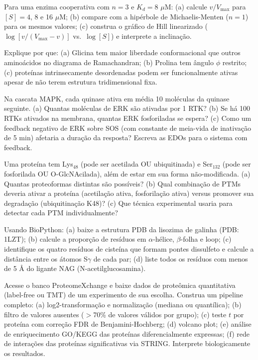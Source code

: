 \begin{exercicio}[Hill]
Para uma enzima cooperativa com $n = 3$ e $K_d = 8$ $\mu$M: (a) calcule $v/V_{\max}$
para $[S] = 4$, 8 e 16 $\mu$M; (b) compare com a hipérbole de Michaelis-Menten
($n = 1$) para os mesmos valores; (c) construa o gráfico de Hill linearizado
($\log[v/(V_{\max}-v)]$ vs.\ $\log[S]$) e interprete a inclinação.
\end{exercicio}

\begin{exercicio}
Explique por que: (a) Glicina tem maior liberdade conformacional que outros aminoácidos
no diagrama de Ramachandran; (b) Prolina tem ângulo $\phi$ restrito; (c) proteínas
intrinsecamente desordenadas podem ser funcionalmente ativas apesar de não terem estrutura
tridimensional fixa.
\end{exercicio}

\begin{exercicio}[MAPK]
Na cascata MAPK, cada quinase ativa em média 10 moléculas da quinase seguinte. (a) Quantas
moléculas de ERK são ativadas por 1 RTK? (b) Se há 100 RTKs ativados na membrana, quantas
ERK fosforiladas se espera? (c) Como um feedback negativo de ERK sobre SOS (com constante
de meia-vida de inativação de 5 min) afetaria a duração da resposta? Escreva as EDOs
para o sistema com feedback.
\end{exercicio}

\begin{exercicio}[PTMs]
Uma proteína tem Lys$_{48}$ (pode ser acetilada OU ubiquitinada) e Ser$_{132}$ (pode ser
fosforilada OU O-GlcNAcilada), além de estar em sua forma não-modificada. (a) Quantas
proteoformas distintas são possíveis? (b) Qual combinação de PTMs deveria ativar a proteína
(acetilação ativa, fosforilação ativa) versus promover sua degradação (ubiquitinação K48)?
(c) Que técnica experimental usaria para detectar cada PTM individualmente?
\end{exercicio}

\begin{exercicio}[BioPython]
Usando BioPython: (a) baixe a estrutura PDB da lisozima de galinha (PDB: 1LZT); (b) calcule
a proporção de resíduos em $\alpha$-hélice, $\beta$-folha e loop; (c) identifique os quatro
resíduos de cisteína que formam pontes dissulfeto e calcule a distância entre os átomos S$\gamma$
de cada par; (d) liste todos os resíduos com menos de 5 Å do ligante NAG (N-acetilglucosamina).
\end{exercicio}

\begin{exercicio}
Acesse o banco ProteomeXchange e baixe dados de proteômica quantitativa (label-free ou TMT)
de um experimento de sua escolha. Construa um pipeline completo: (a) log2-transformação e
normalização (mediana ou quantílica); (b) filtro de valores ausentes ($>$70\% de valores
válidos por grupo); (c) teste $t$ por proteína com correção FDR de Benjamini-Hochberg;
(d) volcano plot; (e) análise de enriquecimento GO/KEGG das proteínas diferencialmente
expressas; (f) rede de interações das proteínas significativas via STRING. Interprete
biologicamente os resultados.
\end{exercicio}

